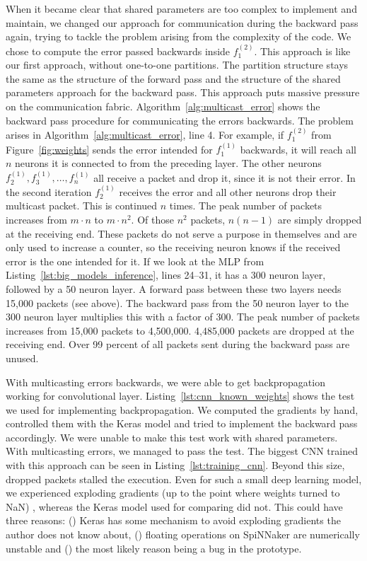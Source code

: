 \documentclass[]{article}
\begin{document}
When it became clear that shared parameters are too complex to
implement and maintain, we changed our approach for communication
during the backward pass again, trying to tackle the problem arising
from the complexity of the code.
We chose to compute the error passed backwards inside $f^{(2)}_1$.
This approach is like our first approach, without one-to-one
partitions.
The partition structure stays the same as the structure of the
forward pass and the structure of the shared parameters approach for
the backward pass.
This approach puts massive pressure on the communication fabric.
Algorithm~\ref{alg:multicast_error} shows the backward pass procedure
for communicating the errors backwards.
The problem arises in Algorithm~\ref{alg:multicast_error}, line 4.
For example, if $f^{(2)}_1$ from Figure~\ref{fig:weights} sends the
error intended for $f^{(1)}_1$ backwards, it will reach all $n$
neurons it is connected to from the preceding layer.
The other neurons $f^{(1)}_2, f^{(1)}_3, \dots, f^{(1)}_n$ all receive
a packet and drop it, since it is not their error.
In the second iteration $f^{(1)}_2$ receives the error and all other
neurons drop their multicast packet.
This is continued $n$ times.
The peak number of packets increases from $m \cdot n$ to
$m \cdot n^2$.
Of those $n^2$ packets, $n(n - 1)$ are simply dropped at the receiving
end.
These packets do not serve a purpose in themselves and are only used
to increase a counter, so the receiving neuron knows if the received
error is the one intended for it.
If we look at the MLP from Listing~\ref{lst:big_models_inference},
lines 24--31, it has a 300 neuron layer, followed by a 50 neuron
layer.
A forward pass between these two layers needs 15,000 packets
(see above).
The backward pass from the 50 neuron layer to the 300 neuron layer
multiplies this with a factor of 300.
The peak number of packets increases from 15,000 packets to 4,500,000.
4,485,000 packets are dropped at the receiving end.
Over 99 percent of all packets sent during the backward pass are
unused.

With multicasting errors backwards, we were able to get
backpropagation working for convolutional layer.
Listing~\ref{lst:cnn_known_weights} shows the test we used for
implementing backpropagation.
We computed the gradients by hand, controlled them with the Keras
model and tried to implement the backward pass accordingly.
We were unable to make this test work with shared parameters.
With multicasting errors, we managed to pass the test.
The biggest CNN trained with this approach can be seen in
Listing~\ref{lst:training_cnn}.
Beyond this size, dropped packets stalled the execution.
Even for such a small deep learning model, we experienced exploding
gradients (up to the point where weights turned to NaN)
\citep{brownlee_2019a}, whereas the Keras model used for comparing
did not.
This could have three reasons: () Keras has some
mechanism to avoid exploding gradients the author does not know about,
() floating operations on SpiNNaker are numerically
unstable and () the most likely reason being a bug
in the prototype.
\end{document}
